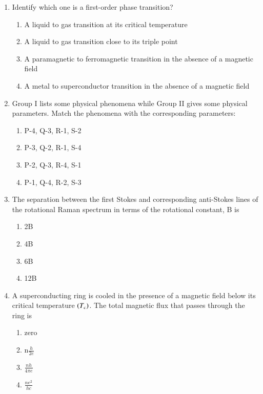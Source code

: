 \documentclass[journal,9pt,onecolumn]{IEEEtran}
\begin{document}
\begin{enumerate}


\item Identify which one is a first-order phase transition?
\begin{enumerate}
     \item A liquid to gas transition at its critical temperature
    \item A liquid to gas transition close to its triple point
    \item A paramagnetic to ferromagnetic transition in the absence of a magnetic field
    \item A metal to superconductor transition in the absence of a magnetic field
\end{enumerate}

\item Group I lists some physical phenomena while Group II gives some physical parameters. Match the phenomena with the corresponding parameters:
\begin{table}[h!]
 	\centering
 	
 	\label{tab:Ph-2009}
 \end{table}
\begin{multicols}{2}
\begin{enumerate}
      \item P-4, Q-3, R-1, S-2
    \item P-3, Q-2, R-1, S-4
    \item P-2, Q-3, R-4, S-1
    \item P-1, Q-4, R-2, S-3
\end{enumerate}
\end{multicols}


\item  The separation between the first Stokes and corresponding anti-Stokes lines of the rotational Raman spectrum in terms of the rotational constant, B is
\begin{multicols}{4}
\begin{enumerate}
    \item 2B
    \item 4B
    \item 6B
    \item 12B
    \end{enumerate}
\end{multicols}


\item   A superconducting ring is cooled in the presence of a magnetic field below its critical temperature $\left(T_c\right)$. The total magnetic flux that passes through the ring is
\begin{multicols}{4}    
\begin{enumerate}
    \item zero
    \item n$\frac{h}{2e}$
    \item $\frac{nh}{4\pi e}$
    \item $\frac{ne^2}{hc}$
\end{enumerate}
\end{multicols}



\end{enumerate}
\end{document}
